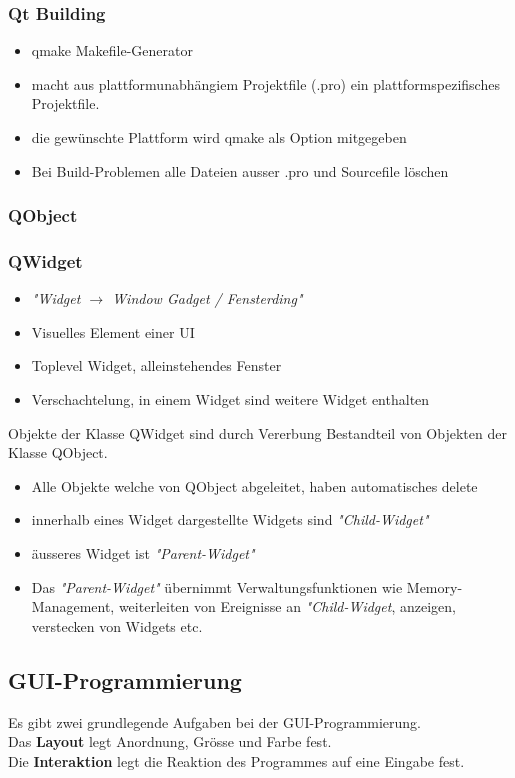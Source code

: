 \subsubsection{Qt Building}
\begin{itemize}
	\item qmake Makefile-Generator
	\item macht aus plattformunabhängiem Projektfile (.pro) ein plattformspezifisches Projektfile. 
	\item die gewünschte Plattform wird qmake als Option mitgegeben
	\item Bei Build-Problemen alle Dateien ausser .pro und Sourcefile löschen
\end{itemize}

\subsubsection{QObject}

\subsubsection{QWidget}
\begin{itemize}
	\item \textit{"Widget $\rightarrow$ Window Gadget / Fensterding"}
	\item Visuelles Element einer UI
	\item Toplevel Widget, alleinstehendes Fenster 
	\item Verschachtelung, in einem Widget sind weitere Widget enthalten
\end{itemize}
Objekte der Klasse QWidget sind durch Vererbung Bestandteil von Objekten der Klasse QObject. 
\begin{itemize}
	\item Alle Objekte welche von QObject abgeleitet, haben automatisches delete
	\item innerhalb eines Widget dargestellte Widgets sind \textit{"Child-Widget"}
	\item äusseres Widget ist \textit{"Parent-Widget"}
	\item Das \textit{"Parent-Widget"} übernimmt Verwaltungsfunktionen wie Memory-Management, weiterleiten von Ereignisse an \textit{"Child-Widget}, anzeigen, verstecken von Widgets etc.
\end{itemize}

\subsection{GUI-Programmierung}
Es gibt zwei grundlegende Aufgaben bei der GUI-Programmierung.\\
Das \textbf{Layout} legt Anordnung, Grösse  und Farbe fest.\\
Die \textbf{Interaktion} legt die Reaktion des Programmes auf eine Eingabe fest. \\
\newpage

